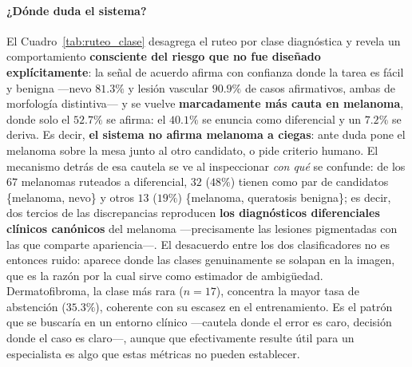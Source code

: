 \documentclass[11pt, a4paper]{article}
\begin{document}
\paragraph{¿Dónde duda el sistema?} El Cuadro~\ref{tab:ruteo_clase} desagrega el ruteo por clase
diagnóstica y revela un comportamiento \textbf{consciente del riesgo que no fue diseñado explícitamente}:
la señal de acuerdo afirma con confianza donde la tarea es fácil y benigna —nevo $81.3\%$ y lesión vascular
$90.9\%$ de casos afirmativos, ambas de morfología distintiva— y se vuelve \textbf{marcadamente más cauta en
melanoma}, donde solo el $52.7\%$ se afirma: el $40.1\%$ se enuncia como diferencial y un $7.2\%$ se deriva.
Es decir, \textbf{el sistema no afirma melanoma a ciegas}: ante duda pone el melanoma sobre la mesa junto al
otro candidato, o pide criterio humano. El mecanismo detrás de esa cautela se ve al inspeccionar
\emph{con qué} se confunde: de los $67$ melanomas ruteados a diferencial, $32$ ($48\%$) tienen como par de
candidatos \{melanoma, nevo\} y otros $13$ ($19\%$) \{melanoma, queratosis benigna\}; es decir, dos tercios
de las discrepancias reproducen \textbf{los diagnósticos diferenciales clínicos canónicos} del melanoma
—precisamente las lesiones pigmentadas con las que comparte apariencia—. El desacuerdo entre los dos
clasificadores no es entonces ruido: aparece donde las clases genuinamente se solapan en la imagen, que es
la razón por la cual sirve como estimador de ambigüedad. Dermatofibroma, la clase más rara ($n=17$), concentra la mayor tasa
de abstención ($35.3\%$), coherente con su escasez en el entrenamiento. Es el patrón que se buscaría en un
entorno clínico —cautela donde el error es caro, decisión donde el caso es claro—, aunque que efectivamente
resulte útil para un especialista es algo que estas métricas no pueden establecer.
\end{document}

